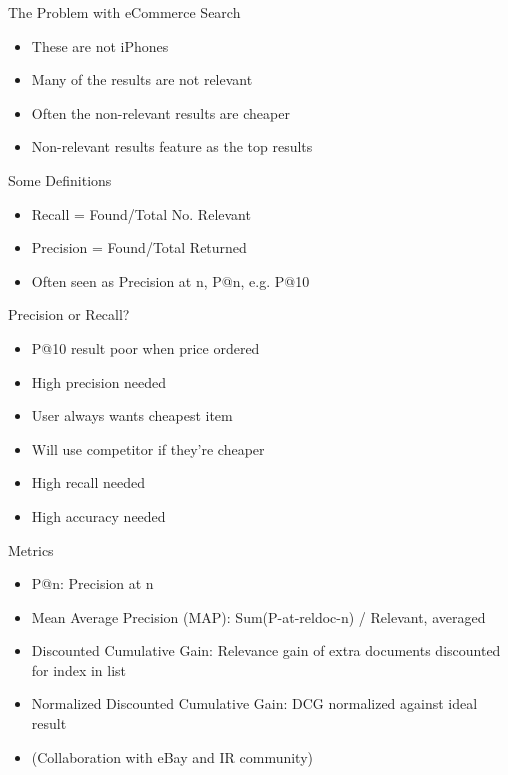\documentclass{beamer}
\begin{document}
\begin{frame}{The Problem with eCommerce Search}
	\begin{itemize}
		\item These are not iPhones
		\item Many of the results are not relevant
		\item Often the non-relevant results are cheaper
		\item Non-relevant results feature as the top results
	\end{itemize}
\end{frame}

\begin{frame}{Some Definitions}
	\begin{itemize}
		\item Recall = Found/Total No. Relevant
		\item Precision = Found/Total Returned
		\item Often seen as Precision at n, P@n, e.g. P@10
	\end{itemize}
\end{frame}

\begin{frame}{Precision or Recall?}
	\begin{itemize}
		\item P@10 result poor when price ordered
		\item High precision needed
		\item User always wants cheapest item
		\item Will use competitor if they're cheaper
		\item High recall needed
		\item High accuracy needed
	\end{itemize}
\end{frame}

\begin{frame}{Metrics}
	\begin{itemize}
		\item P@n: Precision at n
		\item Mean Average Precision (MAP): Sum(P-at-reldoc-n) / Relevant, averaged
		\item Discounted Cumulative Gain: Relevance gain of extra documents discounted for index in list
		\item Normalized Discounted Cumulative Gain: DCG normalized against ideal result
		\item (Collaboration with eBay and IR community)
	\end{itemize}
\end{frame}
\end{document}
